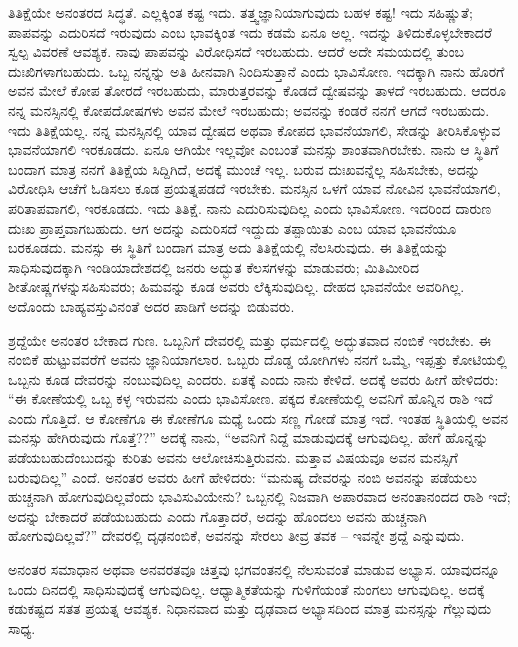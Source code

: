ತಿತಿಕ್ಷೆಯೇ ಅನಂತರದ ಸಿದ್ಧತೆ. ಎಲ್ಲಕ್ಕಿಂತ ಕಷ್ಟ ಇದು. ತತ್ತ್ವಜ್ಞಾನಿಯಾಗುವುದು ಬಹಳ ಕಷ್ಟ! ಇದು ಸಹಿಷ್ಣುತೆ; ಪಾಪವನ್ನು ಎದುರಿಸದೆ ಇರುವುದು ಎಂಬ ಭಾವಕ್ಕಿಂತ ಇದು ಕಡಮೆ ಏನೂ ಅಲ್ಲ. ಇದನ್ನು ತಿಳಿದುಕೊಳ್ಳಬೇಕಾದರೆ ಸ್ವಲ್ಪ ವಿವರಣೆ ಆವಶ್ಯಕ. ನಾವು ಪಾಪವನ್ನು ವಿರೋಧಿಸದೆ ಇರಬಹುದು. ಆದರೆ ಅದೇ ಸಮಯದಲ್ಲಿ ತುಂಬ ದುಃಖಿಗಳಾಗಬಹುದು. ಒಬ್ಬ ನನ್ನನ್ನು ಅತಿ ಹೀನವಾಗಿ ನಿಂದಿಸುತ್ತಾನೆ ಎಂದು ಭಾವಿಸೋಣ. ಇದಕ್ಕಾಗಿ ನಾನು ಹೊರಗೆ ಅವನ ಮೇಲೆ ಕೋಪ ತೋರದೆ ಇರಬಹುದು, ಮಾರುತ್ತರವನ್ನು ಕೊಡದೆ ದ್ವೇಷವನ್ನು ತಾಳದೆ ಇರಬಹುದು. ಆದರೂ ನನ್ನ ಮನಸ್ಸಿನಲ್ಲಿ ಕೋಪದೋಷಗಳು ಅವನ ಮೇಲೆ ಇರಬಹುದು; ಅವನನ್ನು ಕಂಡರೆ ನನಗೆ ಆಗದೆ ಇರಬಹುದು. ಇದು ತಿತಿಕ್ಷೆಯಲ್ಲ. ನನ್ನ ಮನಸ್ಸಿನಲ್ಲಿ ಯಾವ ದ್ವೇಷದ ಅಥವಾ ಕೋಪದ ಭಾವನೆಯಾಗಲಿ, ಸೇಡನ್ನು ತೀರಿಸಿಕೊಳ್ಳುವ ಭಾವನೆಯಾಗಲಿ ಇರಕೂಡದು. ಏನೂ ಆಗಿಯೇ ಇಲ್ಲವೋ ಎಂಬಂತೆ ಮನಸ್ಸು ಶಾಂತವಾಗಿರಬೇಕು. ನಾನು ಆ ಸ್ಥಿತಿಗೆ ಬಂದಾಗ ಮಾತ್ರ ನನಗೆ ತಿತಿಕ್ಷೆಯ ಸಿದ್ದಿಗಿದೆ, ಅದಕ್ಕೆ ಮುಂಚೆ ಇಲ್ಲ. ಬರುವ ದುಃಖವನ್ನೆಲ್ಲ ಸಹಿಸಬೇಕು, ಅದನ್ನು ವಿರೋಧಿಸಿ ಆಚೆಗೆ ಓಡಿಸಲು ಕೂಡ ಪ್ರಯತ್ನಪಡದೆ ಇರಬೇಕು. ಮನಸ್ಸಿನ ಒಳಗೆ ಯಾವ ನೋವಿನ ಭಾವನೆಯಾಗಲಿ, ಪರಿತಾಪವಾಗಲಿ, ಇರಕೂಡದು. ಇದು ತಿತಿಕ್ಷೆ. ನಾನು ಎದುರಿಸುವುದಿಲ್ಲ ಎಂದು ಭಾವಿಸೋಣ. ಇದರಿಂದ ದಾರುಣ ದುಃಖ ಪ್ರಾಪ್ತವಾಗಬಹುದು. ಆಗ ಅದನ್ನು ಎದುರಿಸದೆ ಇದ್ದುದು ತಪ್ಪಾಯಿತು ಎಂಬ ಯಾವ ಭಾವನೆಯೂ ಬರಕೂಡದು. ಮನಸ್ಸು ಈ ಸ್ಥಿತಿಗೆ ಬಂದಾಗ ಮಾತ್ರ ಅದು ತಿತಿಕ್ಷೆಯಲ್ಲಿ ನೆಲಸಿರುವುದು. ಈ ತಿತಿಕ್ಷೆಯನ್ನು ಸಾಧಿಸುವುದಕ್ಕಾಗಿ ಇಂಡಿಯಾದೇಶದಲ್ಲಿ ಜನರು ಅದ್ಭುತ ಕೆಲಸಗಳನ್ನು ಮಾಡುವರು; ಮಿತಿಮೀರಿದ ಶೀತೋಷ್ಣಗಳನ್ನು\break ಸಹಿಸುವರು; ಹಿಮವನ್ನು ಕೂಡ ಅವರು ಲೆಕ್ಕಿಸುವುದಿಲ್ಲ. ದೇಹದ ಭಾವನೆಯೇ ಅವರಿಗಿಲ್ಲ. ಅದೊಂದು ಬಾಹ್ಯವಸ್ತುವಿನಂತೆ ಅದರ ಪಾಡಿಗೆ ಅದನ್ನು ಬಿಡುವರು.

ಶ್ರದ್ದೆಯೇ ಅನಂತರ ಬೇಕಾದ ಗುಣ. ಒಬ್ಬನಿಗೆ ದೇವರಲ್ಲಿ ಮತ್ತು ಧರ್ಮದಲ್ಲಿ ಅದ್ಭುತವಾದ ನಂಬಿಕೆ ಇರಬೇಕು. ಈ ನಂಬಿಕೆ ಹುಟ್ಟುವವರೆಗೆ ಅವನು ಜ್ಞಾನಿಯಾಗಲಾರ. ಒಬ್ಬರು ದೊಡ್ಡ ಯೋಗಿಗಳು ನನಗೆ ಒಮ್ಮೆ, ಇಪ್ಪತ್ತು ಕೋಟಿಯಲ್ಲಿ ಒಬ್ಬನು ಕೂಡ ದೇವರನ್ನು ನಂಬುವುದಿಲ್ಲ ಎಂದರು. ಏತಕ್ಕೆ ಎಂದು ನಾನು ಕೇಳಿದೆ. ಅದಕ್ಕೆ ಅವರು ಹೀಗೆ ಹೇಳಿದರು: “ಈ ಕೋಣೆಯಲ್ಲಿ ಒಬ್ಬ ಕಳ್ಳ ಇರುವನು ಎಂದು ಭಾವಿಸೋಣ. ಪಕ್ಕದ ಕೋಣೆಯಲ್ಲಿ ಅವನಿಗೆ ಹೊನ್ನಿನ ರಾಶಿ ಇದೆ ಎಂದು ಗೊತ್ತಿದೆ. ಆ ಕೋಣೆಗೂ ಈ ಕೋಣೆಗೂ ಮಧ್ಯೆ ಒಂದು ಸಣ್ಣ ಗೋಡೆ ಮಾತ್ರ ಇದೆ. ಇಂತಹ ಸ್ಥಿತಿಯಲ್ಲಿ ಅವನ ಮನಸ್ಸು ಹೇಗಿರುವುದು ಗೊತ್ತೆ??” ಅದಕ್ಕೆ ನಾನು, “ಅವನಿಗೆ ನಿದ್ದೆ ಮಾಡುವುದಕ್ಕೆ ಆಗುವುದಿಲ್ಲ. ಹೇಗೆ ಹೊನ್ನನ್ನು ಪಡೆಯಬಹುದೆಂಬುದನ್ನು ಕುರಿತು ಅವನು ಆಲೋಚಿಸುತ್ತಿರುವನು. ಮತ್ತಾವ ವಿಷಯವೂ ಅವನ ಮನಸ್ಸಿಗೆ ಬರುವುದಿಲ್ಲ” ಎಂದೆ. ಅನಂತರ ಅವರು ಹೀಗೆ ಹೇಳಿದರು: “ಮನುಷ್ಯ ದೇವರನ್ನು ನಂಬಿ ಅವನನ್ನು ಪಡೆಯಲು ಹುಚ್ಚನಾಗಿ ಹೋಗುವುದಿಲ್ಲವೆಂದು ಭಾವಿಸುವಿಯೇನು? ಒಬ್ಬನಲ್ಲಿ ನಿಜವಾಗಿ ಅಪಾರವಾದ ಅನಂತಾನಂದದ ರಾಶಿ ಇದೆ; ಅದನ್ನು ಬೇಕಾದರೆ ಪಡೆಯಬಹುದು ಎಂದು ಗೊತ್ತಾದರೆ, ಅದನ್ನು ಹೊಂದಲು ಅವನು ಹುಚ್ಚನಾಗಿ ಹೋಗುವುದಿಲ್ಲವೆ?'' ದೇವರಲ್ಲಿ ದೃಢನಂಬಿಕೆ, ಅವನನ್ನು ಸೇರಲು ತೀವ್ರ ತವಕ – ಇವನ್ನೇ ಶ್ರದ್ದೆ ಎನ್ನುವುದು.

ಅನಂತರ ಸಮಾಧಾನ ಅಥವಾ ಅನವರತವೂ ಚಿತ್ತವು ಭಗವಂತನಲ್ಲಿ ನೆಲಸುವಂತೆ ಮಾಡುವ ಅಭ್ಯಾಸ. ಯಾವುದನ್ನೂ ಒಂದು ದಿನದಲ್ಲಿ ಸಾಧಿಸುವುದಕ್ಕೆ ಆಗುವುದಿಲ್ಲ. ಆಧ್ಯಾತ್ಮಿಕತೆಯನ್ನು ಗುಳಿಗೆಯಂತೆ ನುಂಗಲು ಆಗುವುದಿಲ್ಲ. ಅದಕ್ಕೆ ಕಡುಕಷ್ಟದ ಸತತ ಪ್ರಯತ್ನ ಆವಶ್ಯಕ. ನಿಧಾನವಾದ ಮತ್ತು ದೃಢವಾದ ಅಭ್ಯಾಸದಿಂದ ಮಾತ್ರ ಮನಸ್ಸನ್ನು ಗೆಲ್ಲುವುದು ಸಾಧ್ಯ.

